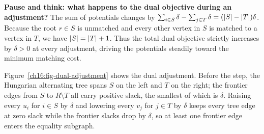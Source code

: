\begin{recoverybox}
\textbf{Pause and think: what happens to the dual objective during an adjustment?}
The sum of potentials changes by $\sum_{i\in S}\delta - \sum_{j\in T}\delta = (\lvert S\rvert-\lvert T\rvert)\delta$. Because the root $r\in S$ is unmatched and every other vertex in $S$ is matched to a vertex in $T$, we have $\lvert S\rvert = \lvert T\rvert+1$. Thus the total dual objective strictly increases by $\delta > 0$ at every adjustment, driving the potentials steadily toward the minimum matching cost.
\end{recoverybox}

Figure~\ref{ch16:fig-dual-adjustment} shows the dual adjustment. Before the step, the Hungarian alternating tree spans $S$ on the left and $T$ on the right; the frontier edges from $S$ to $R\setminus T$ all carry positive slack, the smallest of which is $\delta$. Raising every $u_i$ for $i\in S$ by $\delta$ and lowering every $v_j$ for $j\in T$ by $\delta$ keeps every tree edge at zero slack while the frontier slacks drop by $\delta$, so at least one frontier edge enters the equality subgraph.

